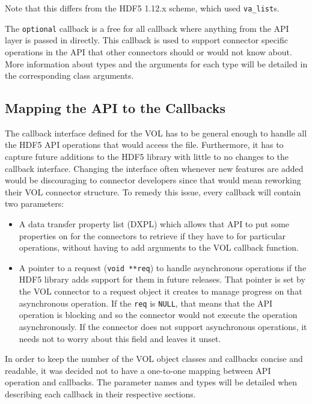 Note that this differs from the HDF5 1.12.x scheme, which used {\tt va\_list}s.

The \texttt{optional} callback is a free for all callback where anything from the API layer is passed in directly. This callback is used to support connector specific operations in the API that other connectors should or would not know about. More information about types and the arguments for each type will be detailed in the corresponding class arguments.

\subsection{Mapping the API to the Callbacks}
\label{sec:map}

The callback interface defined for the VOL has to be general enough to
handle all the HDF5 API operations that would access the
file. Furthermore, it has to capture future additions to the HDF5
library with little to no changes to the callback interface. Changing
the interface often whenever new features are added would be
discouraging to connector developers since that would mean reworking
their VOL connector structure. To remedy this issue, every callback will
contain two parameters:
\begin{itemize}
\item A data transfer property list (DXPL) which allows that API to
  put some properties on for the connectors to retrieve if they have to
  for particular operations, without having to add arguments to the
  VOL callback function.
\item A pointer to a request (\texttt{void **req}) to handle asynchronous
  operations if the HDF5 library adds support for them in future
  releases. That pointer is set by the VOL
  connector to a request object it creates to manage progress on that
  asynchronous operation. If the \texttt{req} is \texttt{NULL}, that means
  that the API operation is blocking and so the connector would not
  execute the operation asynchronously. If the connector does not support
  asynchronous operations, it needs not to worry about this field and
  leaves it unset.
\end{itemize}

In order to keep the number of the VOL object classes and callbacks
concise and readable, it was decided not to have a one-to-one mapping
between API operation and callbacks. The parameter names and types will be
detailed when describing each callback in their respective sections.

